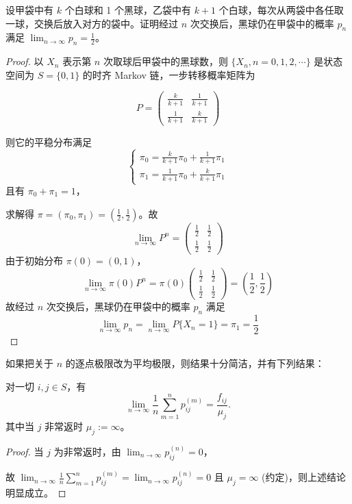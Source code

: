 \documentclass[lang=cn,10pt,thmcnt=section]{elegantbook}
\begin{document}
\begin{example}
	设甲袋中有 $k$ 个白球和 1 个黑球，乙袋中有 $k+1$ 个白球，每次从两袋中各任取一球，交换后放入对方的袋中。证明经过 $n$ 次交换后，黑球仍在甲袋中的概率 $p_n$ 满足 $\lim_{n \to \infty} p_n = \frac{1}{2}$。
\end{example}
\begin{proof}
	以 $X_n$ 表示第 $n$ 次取球后甲袋中的黑球数，则 $\{X_n, n = 0, 1, 2, \cdots\}$ 是状态空间为 $S = \{0, 1\}$ 的时齐 Markov 链，一步转移概率矩阵为

\[
P = \begin{pmatrix}
\frac{k}{k+1} & \frac{1}{k+1} \\
\frac{1}{k+1} & \frac{k}{k+1}
\end{pmatrix}
\]

则它的平稳分布满足
\[
\begin{cases}
\pi_0 = \frac{k}{k+1} \pi_0 + \frac{1}{k+1} \pi_1 \\
\pi_1 = \frac{1}{k+1} \pi_0 + \frac{k}{k+1} \pi_1
\end{cases}
\]
且有 $\pi_0 + \pi_1 = 1$，

求解得 $\pi = (\pi_0, \pi_1) = \left(\frac{1}{2}, \frac{1}{2}\right)$。故
\[
\lim_{n \to \infty} P^n = \begin{pmatrix}
\frac{1}{2} & \frac{1}{2} \\
\frac{1}{2} & \frac{1}{2}
\end{pmatrix}
\]
由于初始分布 $\pi(0) = (0, 1)$，
\[
\lim_{n \to \infty} \pi(0) P^n = \pi(0) \begin{pmatrix}
\frac{1}{2} & \frac{1}{2} \\
\frac{1}{2} & \frac{1}{2}
\end{pmatrix} = \left(\frac{1}{2}, \frac{1}{2}\right)
\]
故经过 $n$ 次交换后，黑球仍在甲袋中的概率 $p_n$ 满足
\[
\lim_{n \to \infty} p_n = \lim_{n \to \infty} P\{X_n = 1\} = \pi_1 = \frac{1}{2}
\]

\end{proof}
如果把关于 $n$ 的逐点极限改为平均极限，则结果十分简洁，并有下列结果：
\begin{theorem}
	对一切 $i, j \in S$，有
\[
\lim_{n \to \infty} \frac{1}{n} \sum_{m=1}^{n} p_{ij}^{(m)} = \frac{f_{ij}}{\mu_j}.
\]
其中当 $j$ 非常返时 $\mu_j := \infty$。

\end{theorem}
\begin{proof}
	当 $j$ 为非常返时，由 $\lim_{n \to \infty} p_{ij}^{(n)} = 0$，

故 $\lim_{n \to \infty} \frac{1}{n} \sum_{m=1}^{n} p_{ij}^{(m)} = \lim_{n \to \infty} p_{ij}^{(n)} = 0$ 且 $\mu_j = \infty$ (约定)，则上述结论明显成立。

\end{proof}
\end{document}
